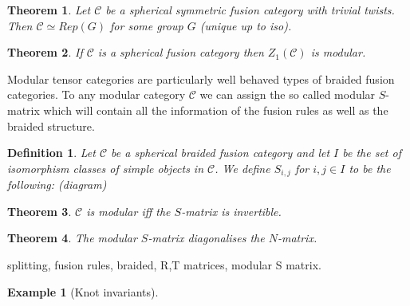 \documentclass{article}
\newtheorem{definition}{Definition}
\newtheorem{example}{Example}
\newtheorem{theorem}{Theorem}
\begin{document}
\begin{theorem}
Let $\mathcal{C}$ be a spherical symmetric fusion category with trivial twists. Then $\mathcal{C} \simeq Rep(G)$ for some group $G$ (unique up to iso).
\end{theorem}

\begin{theorem}
If $\mathcal{C}$ is a spherical fusion category then $Z_1(\mathcal{C})$ is modular.
\end{theorem}
Modular tensor categories are particularly well behaved types of braided fusion categories. To any modular category $\mathcal{C}$ we can assign the so called modular $S$-matrix which will contain all the information of the fusion rules as well as the braided structure.
\begin{definition}
Let $\mathcal{C}$ be a spherical braided fusion category and let $I$ be the set of isomorphism classes of simple objects in $\mathcal{C}$. We define $S_{i,j}$ for $i,j \in I$ to be the following: (diagram)
\end{definition}
\begin{theorem}
$\mathcal{C}$ is modular iff the $S$-matrix is invertible.
\end{theorem}
\begin{theorem}
The modular $S$-matrix diagonalises the $N$-matrix.
\end{theorem}
splitting, fusion rules, braided, R,T matrices, modular S matrix.

\begin{example}[Knot invariants]
\end{example}
\end{document}
